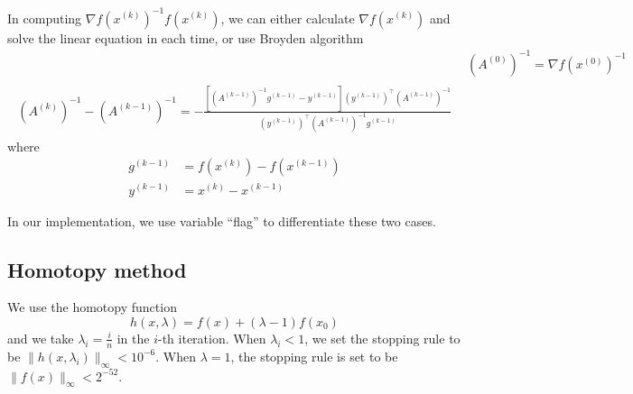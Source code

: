 \documentclass[conference,onecolumn, 12pt]{IEEEtran}
\begin{document}
In computing $\nabla f(x^{(k)})^{-1}f(x^{(k)})$, we can either calculate $\nabla f(x^{(k)})$ and solve the linear equation in each time, or use Broyden algorithm
\begin{subequations}
    \begin{align}
        &(A^{(0)})^{-1}=\nabla f(x^{(0)})^{-1}\\
        \begin{split}
            (A^{(k)})^{-1} - (A^{(k-1)})^{-1} =
            -\frac{[(A^{(k-1)})^{-1}g^{(k-1)}-y^{(k-1)}](y^{(k-1)})^\top (A^{(k-1)})^{-1}}{(y^{(k-1)})^\top(A^{(k-1)})^{-1}g^{(k-1)}}
        \end{split}
    \end{align}
\end{subequations}
where
\begin{subequations}
    \begin{align}
        g^{(k-1)}&=f(x^{(k)})-f(x^{(k-1)})\\
        y^{(k-1)}&=x^{(k)}-x^{(k-1)}
    \end{align}
\end{subequations}

In our implementation, we use variable ``flag'' to differentiate these two cases. 
\subsection{Homotopy method}
We use the homotopy function
\begin{equation}
    h(x,\lambda)=f(x)+(\lambda-1)f(x_0)
\end{equation}
and we take $\lambda_i=\frac{i}{n}$ in the $i$-th iteration. When $\lambda_i < 1$, we set the stopping rule to be $\|h(x,\lambda_i)\|_\infty<10^{-6}$. When $\lambda=1$, the stopping rule is set to be $\|f(x)\|_\infty<2^{-52}$.
\end{document}
